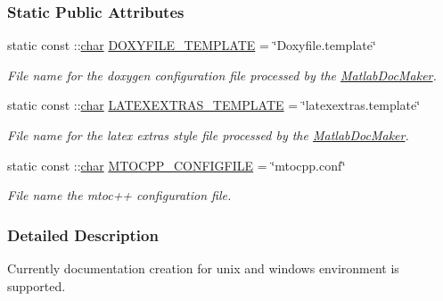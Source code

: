 \subsubsection*{Static Public Attributes}
\begin{DoxyCompactItemize}
\item 
static const \+::\hyperlink{classchar}{char} \hyperlink{class_matlab_doc_maker_ab9514d0ba074c3b92a7fae2b50846b90}{D\+O\+X\+Y\+F\+I\+L\+E\+\_\+\+T\+E\+M\+P\+L\+A\+T\+E} = \char`\"{}Doxyfile.\+template\char`\"{}
\begin{DoxyCompactList}\small\item\em File name for the doxygen configuration file processed by the \hyperlink{class_matlab_doc_maker}{Matlab\+Doc\+Maker}. \end{DoxyCompactList}\item 
static const \+::\hyperlink{classchar}{char} \hyperlink{class_matlab_doc_maker_a5fd9647b943b91d54acbfce17d0d7416}{L\+A\+T\+E\+X\+E\+X\+T\+R\+A\+S\+\_\+\+T\+E\+M\+P\+L\+A\+T\+E} = \char`\"{}latexextras.\+template\char`\"{}
\begin{DoxyCompactList}\small\item\em File name for the latex extras style file processed by the \hyperlink{class_matlab_doc_maker}{Matlab\+Doc\+Maker}. \end{DoxyCompactList}\item 
static const \+::\hyperlink{classchar}{char} \hyperlink{class_matlab_doc_maker_ab61ab79ccd92642c4fef74c6abbee559}{M\+T\+O\+C\+P\+P\+\_\+\+C\+O\+N\+F\+I\+G\+F\+I\+L\+E} = \char`\"{}mtocpp.\+conf\char`\"{}
\begin{DoxyCompactList}\small\item\em File name the mtoc++ configuration file. \end{DoxyCompactList}\end{DoxyCompactItemize}


\subsubsection{Detailed Description}
Currently documentation creation for unix and windows environment is supported.

